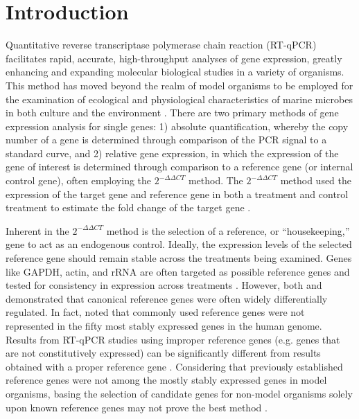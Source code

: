 \section{Introduction}
Quantitative reverse transcriptase polymerase chain reaction (RT-qPCR) facilitates rapid, accurate, high-throughput analyses of gene expression, greatly enhancing and expanding molecular biological studies in a variety of organisms. This method has moved beyond the realm of model organisms \citep{Adib2004,Antonov2005, Caldwell2005, Marionneau2005, Flatt2008} to be employed for the examination of ecological and physiological characteristics of marine microbes in both culture and the environment \citep{Zehr2001, Nicot2005, Maldonado2006, Mock2008, Zhao2009, Whitney2011a, Wurch2011, Allen2008, Kustka2007, Lin2009}. There are two primary methods of gene expression analysis for single genes: 1) absolute quantification, whereby the copy number of a gene is determined through comparison of the PCR signal to a standard curve, and 2) relative gene expression, in which the expression of the gene of interest is determined through comparison to a reference gene (or internal control gene), often employing the $2^{- \Delta \Delta CT}$ method. The $2^{- \Delta \Delta CT}$ method used the expression of the target gene and reference gene in both a treatment and control treatment to estimate the fold change of the target gene \citep{Livak2001, Pfaffl2001, Schmittgen2008}. \par
Inherent in the $2^{- \Delta \Delta CT}$ method is the selection of a reference, or ``housekeeping,'' gene to act as an endogenous control. Ideally, the expression levels of the selected reference gene should remain stable across the treatments being examined. Genes like GAPDH, actin, and rRNA are often targeted as possible reference genes and tested for consistency in expression across treatments \citep{Vandesompele2002, Pfaffl2004, Radonic2004}. However, both \citet{Czechowski2005} and \citet{DeJonge2007a} demonstrated that canonical reference genes were often widely differentially regulated. In fact, \citet{DeJonge2007a} noted that commonly used reference genes were not represented in the fifty most stably expressed genes in the human genome. Results from RT-qPCR studies using improper reference genes (e.g. genes that are not constitutively expressed) can be significantly different from results obtained with a proper reference gene \citep{Dheda2005, Lanoix2012a}. Considering that previously established reference genes were not among the mostly stably expressed genes in model organisms, basing the selection of candidate genes for non-model organisms solely upon known reference genes may not prove the best method \citep{DeJonge2007a, Czechowski2005}. \par
